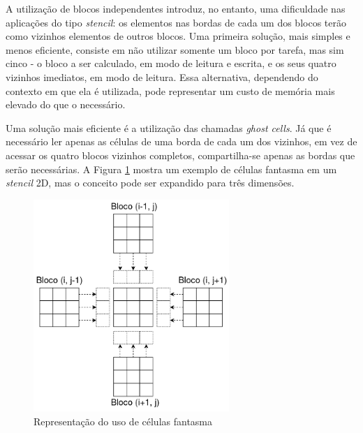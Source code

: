 \documentclass[cic,tc]{iiufrgs}
\begin{document}
A utilização de blocos independentes introduz, no entanto, uma dificuldade nas aplicações do tipo \textit{stencil}: os elementos nas bordas de cada um dos blocos terão como vizinhos
elementos de outros blocos. Uma primeira solução, mais simples e menos eficiente, consiste em não utilizar somente um bloco por tarefa, mas sim cinco - o bloco a ser calculado, em
modo de leitura e escrita, e os seus quatro vizinhos imediatos, em modo de leitura. Essa alternativa, dependendo do contexto em que ela é utilizada, pode representar um custo de memória mais
elevado do que o necessário.

Uma solução mais eficiente é a utilização das chamadas \textit{ghost cells}. Já que é necessário ler apenas as células de uma borda de cada um dos vizinhos, em vez de acessar os quatro
blocos vizinhos completos, compartilha-se apenas as bordas que serão necessárias. A Figura \ref{fig:ghost_cells} mostra um exemplo de células fantasma em um \textit{stencil} 2D,
mas o conceito pode ser expandido para três dimensões.

\begin{figure}[!htb]
    \caption{Representação do uso de células fantasma}
    \begin{center}
      \includegraphics[width=20em]{ghost_cells}
    \end{center}
    \label{fig:ghost_cells}
\end{figure}
\end{document}
